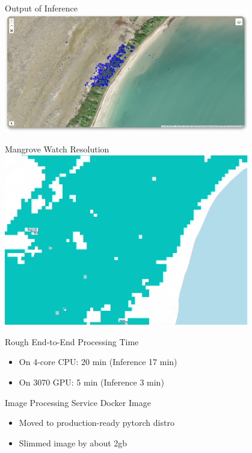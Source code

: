 \begin{frame}{Output of Inference}
    \centering
    \includegraphics[height=0.8\textheight,width=0.8\textwidth,keepaspectratio]{images/mm_inference.png}
\end{frame}

\begin{frame}{Mangrove Watch Resolution}
    \centering
    \includegraphics[height=0.8\textheight,width=0.8\textwidth,keepaspectratio]{images/mm_mangrovewatch.png}
\end{frame}

\begin{frame}{Rough End-to-End Processing Time}
    \begin{itemize}
        \item On 4-core CPU: 20 min (Inference 17 min)
        \item On 3070 GPU: 5 min (Inference 3 min)
    \end{itemize}    
\end{frame}

\begin{frame}{Image Processing Service Docker Image}
    \begin{itemize}
        \item Moved to production-ready pytorch distro
        \item Slimmed image by about 2gb
    \end{itemize}    
\end{frame}

